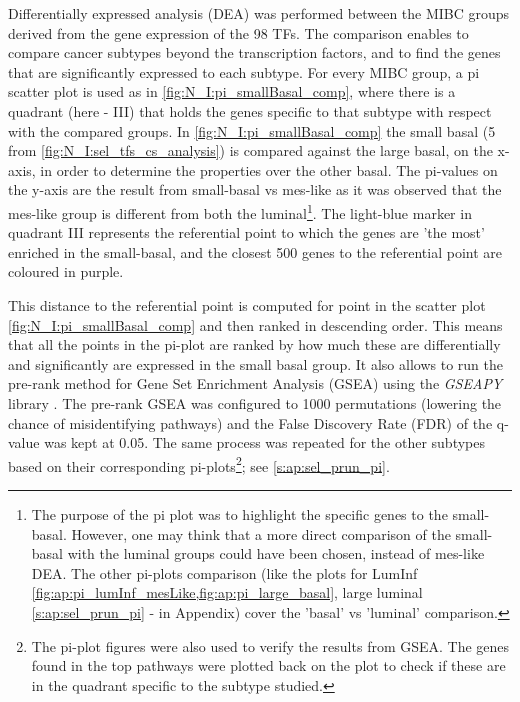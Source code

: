 Differentially expressed analysis (DEA) was performed between the MIBC groups derived from the gene expression of the 98 TFs. The comparison enables to compare cancer subtypes beyond the transcription factors, and to find the genes that are significantly expressed to each subtype. For every MIBC group, a pi scatter plot is used as in \cref{fig:N_I:pi_smallBasal_comp}, where there is a quadrant (here - III) that holds the genes specific to that subtype with respect with the compared groups. In \cref{fig:N_I:pi_smallBasal_comp} the small basal (5 from \cref{fig:N_I:sel_tfs_cs_analysis}) is compared against the large basal, on the x-axis, in order to determine the properties over the other basal. The pi-values on the y-axis are the result from small-basal vs mes-like as it was observed that the mes-like group is different from both the luminal\footnote{The purpose of the pi plot was to highlight the specific genes to the small-basal. However, one may think that a more direct comparison of the small-basal with the luminal groups could have been chosen, instead of mes-like DEA. The other pi-plots comparison (like the plots for LumInf \cref{fig:ap:pi_lumInf_mesLike,fig:ap:pi_large_basal},  large luminal \cref{s:ap:sel_prun_pi} - in Appendix) cover the 'basal' vs 'luminal' comparison. }. The light-blue marker in quadrant III represents the referential point to which the genes are 'the most' enriched in the small-basal, and the closest 500 genes to the referential point are coloured in purple. 


This distance to the referential point is computed for point in the scatter plot \cref{fig:N_I:pi_smallBasal_comp} and then ranked in descending order. This means that all the points in the pi-plot are ranked by how much these are differentially and significantly are expressed in the small basal group. It also allows to run the pre-rank method for Gene Set Enrichment Analysis (GSEA) using the \textit{GSEAPY} library \citet{Fang2023-ec}. The pre-rank GSEA was configured to 1000 permutations (lowering the chance of misidentifying pathways) and the False Discovery Rate (FDR) of the q-value was kept at 0.05. The same process was repeated for the other subtypes based on their corresponding pi-plots\footnote{The pi-plot figures were also used to verify the results from GSEA. The genes found in the top pathways were plotted back on the plot to check if these are in the quadrant specific to the subtype studied.}; see \cref{s:ap:sel_prun_pi}.

